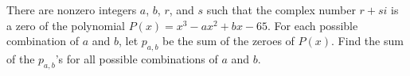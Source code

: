 There are nonzero integers $a$, $b$, $r$, and $s$ such that the complex number $r+si$ is a zero of the polynomial $P(x) = x^3 - ax^2 + bx - 65$. For each possible combination of $a$ and $b$, let $p_{a,b}$ be the sum of the zeroes of $P(x)$. Find the sum of the $p_{a,b}$'s for all possible combinations of $a$ and $b$.